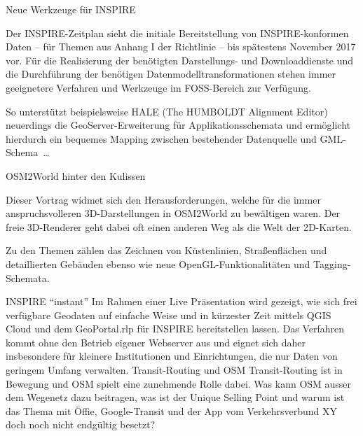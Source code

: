 \newpage
\enlargethispage{1\baselineskip}
\vspace{0.2\baselineskip}\newline

%

%
{Neue Werkzeuge für INSPIRE}%
{}%
{Der INSPIRE-Zeitplan sieht die initiale Bereitstellung von INSPIRE-konformen
Daten -- für Themen aus Anhang I der Richtlinie -- bis spätestens November 2017 vor.
Für die Realisierung der benötigten Darstellungs- und Download\-dienste und die Durchführung
der benötigen Datenmodelltransformationen stehen immer geeignetere Verfahren und Werkzeuge
im FOSS-Bereich zur Verfügung.

So unterstützt beispielsweise HALE (The HUMBOLDT Alignment Editor) neuerdings die GeoServer-Erweiterung
für Applikationsschemata und ermöglicht hierdurch ein bequemes Mapping zwischen
bestehender Datenquelle und GML-Schema~\dots}

\enlargethispage{2\baselineskip}
%
{OSM2World hinter den Kulissen}%
{}%
{Dieser Vortrag widmet sich den Herausforderungen, welche für die immer anspruchsvolleren 3D-Darstellungen in
OSM2World zu bewältigen waren. Der freie 3D-Renderer geht dabei oft einen anderen Weg als die Welt der 2D-Karten.

Zu den Themen zählen das Zeichnen von Küstenlinien, Straßenflächen und detaillierten Gebäuden ebenso wie neue
OpenGL-Funktionalitäten und Tagging-Schemata.}
%
%
{INSPIRE "`instant"'}%
{}%
{Im Rahmen einer Live Präsentation wird gezeigt, wie sich frei verfügbare Geodaten auf einfache Weise und
in kürzester Zeit mittels QGIS Cloud und dem GeoPortal.rlp für INSPIRE bereitstellen lassen.
Das Verfahren kommt ohne den Betrieb eigener Webserver aus und eignet sich daher insbesondere
für kleinere Institutionen und Einrichtungen, die nur Daten von geringem Umfang verwalten.}
%
%
{Transit-Routing und OSM}%
{}%
{Transit-Routing ist in Bewegung und OSM spielt eine zunehmende Rolle dabei.
Was kann OSM ausser dem Wegenetz dazu beitragen, was ist der Unique Selling Point
und warum ist das Thema mit Öffie, Google-Transit und der App vom Verkehrsverbund XY doch noch nicht endgültig besetzt?}

